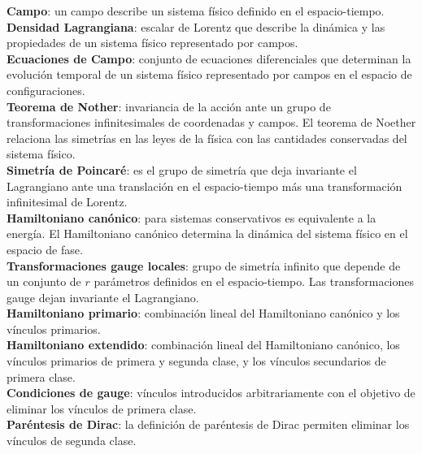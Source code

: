 \documentclass[a4paper,12pt]{article}
\begin{document}
\textbf{Campo}: un campo describe un sistema físico definido en el espacio-tiempo.  
\\

\textbf{Densidad Lagrangiana}: escalar de Lorentz que describe la dinámica y las propiedades de un sistema físico representado por campos.
\\

\textbf{Ecuaciones de Campo}: conjunto de ecuaciones diferenciales que determinan la evolución temporal de un sistema físico representado por campos en el espacio de configuraciones.
\\

\textbf{Teorema de Nother}: invariancia de la acción ante un grupo de \mbox{transformaciones} infinitesimales de coordenadas y campos. El teorema de Noether relaciona las simetrías en las leyes de la física con las cantidades conservadas del sistema físico.
\\

\textbf{Simetría de Poincaré}: es el grupo de simetría que deja invariante el Lagrangiano ante una translación en el \mbox{espacio-tiempo} más una transformación infinitesimal de Lorentz. 
\\

\textbf{Hamiltoniano canónico}: para sistemas conservativos es equivalente a la energía. El Hamiltoniano canónico determina la dinámica del sistema físico en el espacio de fase.
\\

\textbf{Transformaciones gauge locales}: grupo de simetría infinito que depende de un conjunto de $r$ \mbox{parámetros} definidos en el espacio-tiempo. Las transformaciones gauge dejan invariante el Lagrangiano.
\\

\textbf{Hamiltoniano primario}: combinación lineal del Hamiltoniano canónico y los vínculos primarios.
\\

\textbf{Hamiltoniano extendido}: combinación lineal del Hamiltoniano canónico, los vínculos primarios de primera y segunda clase, y los vínculos secundarios de primera clase.
\\

\textbf{Condiciones de gauge}: vínculos introducidos arbitrariamente con el objetivo de eliminar los vínculos de primera clase.
\\

\textbf{Paréntesis de Dirac}: la definición de paréntesis de Dirac permiten eliminar los vínculos de segunda clase.
\newpage
\end{document}
